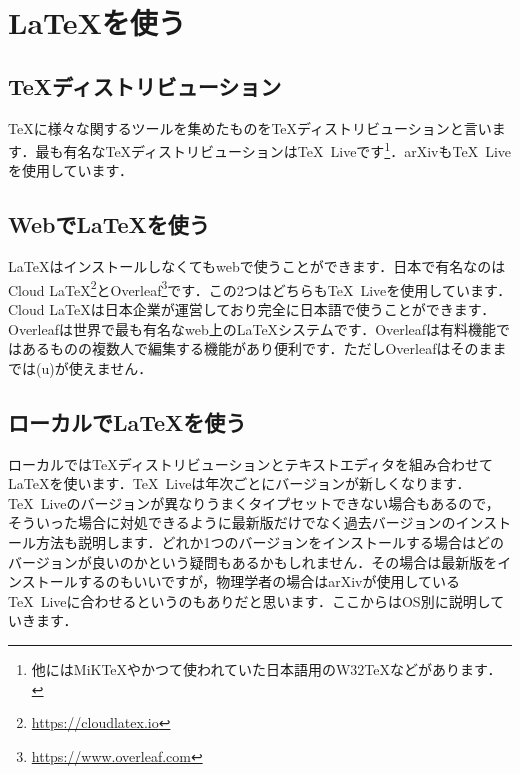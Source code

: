 \section{\LaTeX を使う}
\subsection{\TeX ディストリビューション}
\TeX に様々な関するツールを集めたものを\TeX ディストリビューションと言います．最も有名な\TeX ディストリビューションは\TeX\ Liveです\footnote{他にはMiK\TeX やかつて使われていた日本語用のW32\TeX などがあります．}．arXivも\TeX\ Liveを使用しています．

\subsection{Webで\LaTeX を使う}
\LaTeX はインストールしなくてもwebで使うことができます．日本で有名なのはCloud LaTeX\footnote{\url{https://cloudlatex.io}}とOverleaf\footnote{\url{https://www.overleaf.com}}です．この2つはどちらも\TeX\ Liveを使用しています．Cloud LaTeXは日本企業が運営しており完全に日本語で使うことができます．Overleafは世界で最も有名なweb上の\LaTeX システムです．Overleafは有料機能ではあるものの複数人で編集する機能があり便利です．ただしOverleafはそのままでは(u)\pLaTeX が使えません．

\subsection{ローカルで\LaTeX を使う}
ローカルでは\TeX ディストリビューションとテキストエディタを組み合わせて\LaTeX を使います．\TeX\ Liveは年次ごとにバージョンが新しくなります．\TeX\ Liveのバージョンが異なりうまくタイプセットできない場合もあるので，そういった場合に対処できるように最新版だけでなく過去バージョンのインストール方法も説明します．どれか1つのバージョンをインストールする場合はどのバージョンが良いのかという疑問もあるかもしれません．その場合は最新版をインストールするのもいいですが，物理学者の場合はarXivが使用している\TeX\ Liveに合わせるというのもありだと思います．ここからはOS別に説明していきます．


